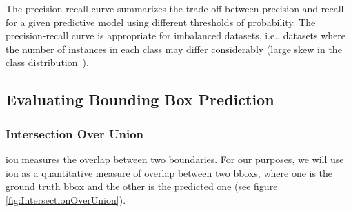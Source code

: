 The precision-recall curve summarizes the trade-off between precision and recall for a given predictive model using different thresholds of probability. The precision-recall curve is appropriate for imbalanced datasets, i.e., datasets where the number of instances in each class may differ considerably (large skew in the class distribution~\cite{davis2016prcurves}).

\subsection{Evaluating Bounding Box Prediction}
\label{ssec:EvaluatingBoundingBoxPrediction}

\subsubsection{Intersection Over Union}
\label{sssec:IntersectionOverUnion}


\Gls{iou} measures the overlap between two boundaries. For our purposes, we will use \gls{iou} as a quantitative measure of overlap between two \glspl{bbox}, where one is the ground truth \gls{bbox} and the other is the predicted one (see figure \ref{fig:IntersectionOverUnion}).

